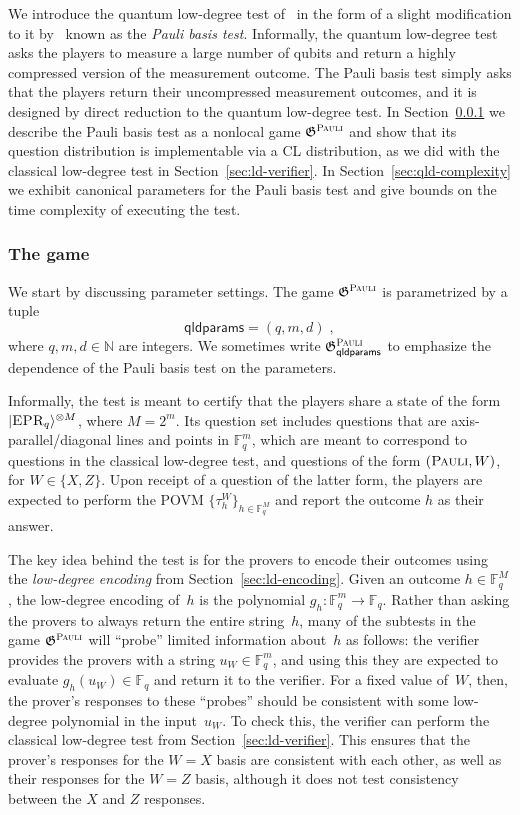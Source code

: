 \documentclass[11pt]{article}
\theoremstyle{definition}
\newcommand{\ket}[1]{|#1\rangle}
\newcommand{\N}{\ensuremath{\mathbb{N}}}
\newcommand{\F}{\ensuremath{\mathbb{F}}}
\newcommand{\game}{\mathfrak{G}}
\newcommand{\gamestyle}[1]{\ensuremath{\textsc{#1}}\xspace}
\newcommand{\pauli}{\gamestyle{Pauli}}
\newcommand{\labelstyle}[1]{\ensuremath{\textsc{#1}}\xspace}
\newcommand{\EPR}{\labelstyle{EPR}}
\newcommand{\typestyle}[1]{\ensuremath{\textsc{#1}}\xspace}
\newcommand{\Pauli}{\typestyle{Pauli}}
\newcommand{\qldparams}{\mathsf{qldparams}}
\begin{document}
We introduce the quantum low-degree test of~\cite{natarajan2018low} in the form
of a slight modification to it by~\cite{NW19} known as the \emph{Pauli basis
  test}.
Informally, the quantum low-degree test asks the players to measure a large
number of qubits and return a highly compressed version of the measurement
outcome.
The Pauli basis test simply asks that the players return their uncompressed
measurement outcomes, and it is designed by direct reduction to the quantum
low-degree test.
In Section~\ref{sec:qld-game} we describe the Pauli basis test as a nonlocal
game $\game^\pauli$ and show that its question distribution is implementable via
a CL distribution, as we did with the classical low-degree test in
Section~\ref{sec:ld-verifier}.
In Section~\ref{sec:qld-complexity} we exhibit canonical parameters for the
Pauli basis test and give bounds on the time complexity of executing the test.

\subsubsection{The game}
\label{sec:qld-game}

We start by discussing parameter settings.
The game $\game^\pauli$ is parametrized by a tuple
\[\qldparams = (q,m,d)\;,\] where $q,m,d \in \N$ are integers. 
We sometimes write $\game^\pauli_\qldparams$ to emphasize the dependence of the
Pauli basis test on the parameters.

Informally, the test is meant to certify that the players share a state of the
form $\ket{\EPR_q}^{\otimes M}$, where $M=2^m$.
Its question set includes questions that are axis-parallel/diagonal lines and points in $\F_q^m$,
which are meant to correspond to questions in the classical low-degree test, and questions
of the form $(\Pauli, W)$, for $W \in \{X, Z\}$.
Upon receipt of a question of the latter form, the players are expected to
perform the POVM $\{\tau_h^W\}_{h \in \F_q^{M}}$ and report the outcome $h$ as
their answer.

The key idea behind the test
is for the provers to encode their outcomes using the \emph{low-degree encoding} from Section~\ref{sec:ld-encoding}.
Given an outcome $h \in \F_q^M$, the low-degree encoding of~$h$ is the polynomial $g_h:\F_q^m \rightarrow \F_q$.
Rather than asking the provers to always return the entire string~$h$,
many of the subtests in the game $\game^\pauli$ will ``probe'' limited information about~$h$ as follows:
the verifier provides the provers with a string $u_W \in \F_q^m$,
and using this they are expected to evaluate $g_h(u_W) \in \F_q$ and return it to the verifier.
For a fixed value of~$W$, then, the prover's responses to these ``probes'' should be consistent with some low-degree polynomial in the input~$u_W$.
To check this, the verifier can perform the classical low-degree test from Section~\ref{sec:ld-verifier}.
This ensures that the prover's responses for the $W = X$ basis are consistent with each other,
as well as their responses for the $W = Z$ basis, although it does not test consistency between the $X$ and $Z$ responses.
\end{document}

